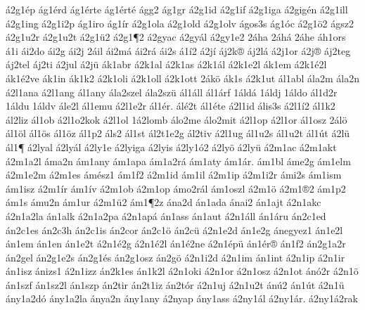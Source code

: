 {^^e12g1^^e9p
^^e1g1^^e9rd
^^e1g1^^e9rte
^^e1g1^^e9rt^^e9
^^e1gg2
^^e1g1gr
^^e12g1id
^^e12g1if
^^e12g1iga
^^e12gig^^e9n
^^e12g1ill
^^e12g1ing
^^e12g1i2p
^^e1g1iro
^^e1g1^^edr
^^e12g1ola
^^e12g1old
^^e12g1olv
^^e1gos3s
^^e1g1^^f3c
^^e12g1^^f62
^^e1gsz2
^^e12g1u2r
^^e12g1u2t
^^e12g1^^fc2
^^e12g1^^b62
^^e12gyac
^^e12gy^^e1l
^^e12gy1e2
2^^e1ha
2^^e1h^^e1
2^^e1he
^^e1h1ors
^^e11i
^^e1i2do
^^e1i2g
^^e1i2j
2^^e1il
^^e1i2m^^e1
^^e1i2r^^e1
^^e1i2s
^^e11^^ed2
^^e12j^^ed
^^e1j2k^^ae
^^e1j2l^^e1
^^e12j1or
^^e12j^^ae
^^e1j2teg
^^e1j2tel
^^e1j2ti
^^e12jul
^^e12j^^fc
^^e1k1abr
^^e12k1al
^^e12k1as
^^e12k1^^e1l
^^e12k1e2l
^^e1k1em
^^e12k1^^e92l
^^e1k1^^e92ve
^^e1k1in
^^e1k1k2
^^e12k1oli
^^e12k1oll
^^e12k1ott
2^^e1k^^f6
^^e1k1s
^^e12k1ut
^^e1l1abl
^^e1la2m
^^e1la2n
^^e12l1ana
^^e12l1ang
^^e1l1any
^^e1la2szel
^^e1la2sz^^fc
^^e1l1^^e1ll
^^e1l1^^e1rf
1^^e1ld^^e1
1^^e1ldj
1^^e1ldo
^^e1l1d2r
1^^e1ldu
1^^e1ldv
^^e1le2l
^^e1l1emu
^^e12l1e2r
^^e1l1^^e9r.
^^e1l^^e92t
^^e1l1^^e9te
^^e12l1id
^^e1lis3s
^^e12l1^^ed2
^^e1l1k2
^^e1l2liz
^^e1l1ob
^^e12l1o2kok
^^e12l1ol
1^^e12lomb
^^e1lo2me
^^e1lo2mit
^^e12l1op
^^e12l1or
^^e1l1osz
2^^e1l^^f6
^^e1l1^^f6l
^^e1l1^^f6s
^^e1l1^^f6z
^^e1l1p2
^^e1ls2
^^e1l1st
^^e1l2t1e2g
^^e1l2tiv
^^e12l1ug
^^e1l1u2s
^^e1l1u2t
^^e1l1^^fat
^^e12l^^fc
^^e1l1^^b6
^^e12lyal
^^e12ly^^e1l
^^e12ly1e
^^e12lyiga
^^e12lyis
^^e12ly1^^f32
^^e12ly^^f6
^^e12ly^^fc
^^e12m1ac
^^e12m1akt
^^e12m1a2l
^^e1ma2n
^^e1m1any
^^e1m1apa
^^e1m1a2r^^e1
^^e1m1aty
^^e1m1^^e1r.
^^e1m1bl
^^e1me2g
^^e1m1elm
^^e12m1e2m
^^e12m1es
^^e1m^^e9sz1
^^e1m1f2
^^e12m1id
^^e1m1il
^^e12m1ip
^^e12m1i2r
^^e1mi2s
^^e1m1ism
^^e1m1isz
^^e12m1^^edr
^^e1m1^^edv
^^e12m1ob
^^e12m1op
^^e1mo2r^^e1l
^^e1m1oszl
^^e12m1^^f6
^^e12m1^^ae2
^^e1m1p2
^^e1m1s
^^e1mu2n
^^e1m1ur
^^e12m1^^fc2
^^e1m1^^b62z
^^e1na2d
^^e1n1ada
^^e1nai2
^^e1n1ajt
^^e12n1akc
^^e12n1a2la
^^e1n1alk
^^e12n1a2pa
^^e12n1ap^^e1
^^e1n1ass
^^e1n1aut
^^e12n1^^e1ll
^^e1n1^^e1ru
^^e1n2c1ed
^^e1n2c1es
^^e1n2c3h
^^e1n2c1is
^^e1n2cor
^^e1n2c1^^f6
^^e1n2c^^fc
^^e12n1e2d
^^e1n1e2g
^^e1negyez1
^^e1n1e2l
^^e1n1em
^^e1n1en
^^e1n1e2t
^^e12n1^^e92g
^^e12n1^^e92l
^^e1n1^^e92ne
^^e12n1^^e9p^^fc
^^e1n1^^e9r^^ae
^^e1n1f2
^^e1n2g1a2r
^^e1n2gel
^^e1n2g1e2s
^^e1n2g1^^e9s
^^e1n2g1osz
^^e1n2g^^f6
^^e12n1i2d
^^e12n1im
^^e1n1int
^^e12n1ip
^^e12n1ir
^^e1n1isz
^^e1nizs1
^^e12n1izz
^^e1n2k1es
^^e1n1k2l
^^e12n1oki
^^e12n1or
^^e12n1osz
^^e12n1ot
^^e1n^^f32r
^^e12n1^^f6
^^e1n1szf
^^e1n1sz2l
^^e1n1szp
^^e1n2tir
^^e1n2t1iz
^^e1n2t^^f3r
^^e12n1uj
^^e12n1u2t
^^e1n^^fa2
^^e1n1^^fat
^^e12n1^^fc
^^e1ny1a2d^^f3
^^e1ny1a2la
^^e1nya2n
^^e1ny1any
^^e12nyap
^^e1ny1ass
^^e12ny1^^e1l
^^e12ny1^^e1r.
^^e12ny1^^e12rak
}
